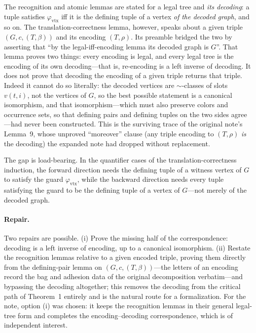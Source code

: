 \documentclass[11pt]{article}
\begin{document}
The recognition and atomic lemmas are stated for a legal tree and \emph{its
decoding}: a tuple satisfies \(\varphi_{\mathrm{vtx}}\) iff it is the defining
tuple of a vertex \emph{of the decoded graph}, and so on.  The
translation-correctness lemma, however, speaks about a given triple
\((G,c,(T,\beta))\) and its encoding \((T,\rho)\).  Its preamble bridged the
two by asserting that ``by the legal-iff-encoding lemma its decoded graph is
\(G\)''.  That lemma proves two things: every encoding is legal, and every
legal tree is the encoding of its own decoding---that is, re-encoding is a
left inverse of decoding.  It does not prove that decoding the encoding of a
given triple returns that triple.  Indeed it cannot do so literally: the
decoded vertices are \(\sim\)-classes of slots \(v(t,i)\), not the vertices
of \(G\), so the best possible statement is a canonical isomorphism, and that
isomorphism---which must also preserve colors and occurrence sets, so that
defining pairs and defining tuples on the two sides agree---had never been
constructed.  This is the surviving trace of the original note's Lemma~9,
whose unproved ``moreover'' clause (any triple encoding to \((T,\rho)\)
\emph{is} the decoding) the expanded note had dropped without replacement.

The gap is load-bearing.  In the quantifier cases of the
translation-correctness induction, the forward direction needs the defining
tuple of a witness vertex of \(G\) to satisfy the guard
\(\varphi_{\mathrm{vtx}}\), while the backward direction needs every tuple
satisfying the guard to be the defining tuple of a vertex of \(G\)---not
merely of the decoded graph.

\paragraph{Repair.} Two repairs are possible.  (i) Prove the missing half of
the correspondence: decoding is a left inverse of encoding, up to a canonical
isomorphism.  (ii) Restate the recognition lemmas relative to a given encoded
triple, proving them directly from the defining-pair lemma on
\((G,c,(T,\beta))\)---the letters of an encoding record the bag and adhesion
data of the original decomposition verbatim---and bypassing the decoding
altogether; this removes the decoding from the critical path of Theorem~1
entirely and is the natural route for a formalization.  For the note, option
(i) was chosen: it keeps the recognition lemmas in their general legal-tree
form and completes the encoding--decoding correspondence, which is of
independent interest.
\end{document}
